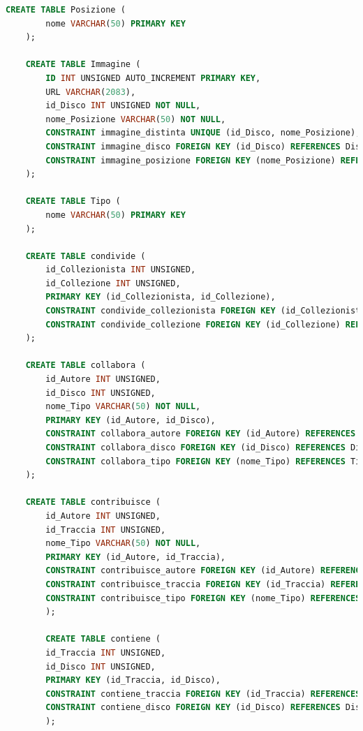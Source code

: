 \documentclass{article}
\begin{document}
\begin{lstlisting}[language=SQL]
    CREATE TABLE Posizione (
        nome VARCHAR(50) PRIMARY KEY
    );

    CREATE TABLE Immagine (
        ID INT UNSIGNED AUTO_INCREMENT PRIMARY KEY,
        URL VARCHAR(2083),
        id_Disco INT UNSIGNED NOT NULL,
        nome_Posizione VARCHAR(50) NOT NULL,
        CONSTRAINT immagine_distinta UNIQUE (id_Disco, nome_Posizione),
        CONSTRAINT immagine_disco FOREIGN KEY (id_Disco) REFERENCES Disco(ID) ON DELETE CASCADE ON UPDATE CASCADE,
        CONSTRAINT immagine_posizione FOREIGN KEY (nome_Posizione) REFERENCES Posizione(nome) ON DELETE NO ACTION ON UPDATE CASCADE
    );

    CREATE TABLE Tipo (
        nome VARCHAR(50) PRIMARY KEY
    );

    CREATE TABLE condivide (
        id_Collezionista INT UNSIGNED,
        id_Collezione INT UNSIGNED,
        PRIMARY KEY (id_Collezionista, id_Collezione),
        CONSTRAINT condivide_collezionista FOREIGN KEY (id_Collezionista) REFERENCES Collezionista(ID) ON DELETE CASCADE ON UPDATE CASCADE,
        CONSTRAINT condivide_collezione FOREIGN KEY (id_Collezione) REFERENCES Collezione(ID) ON DELETE CASCADE ON UPDATE CASCADE
    );

    CREATE TABLE collabora (
        id_Autore INT UNSIGNED,
        id_Disco INT UNSIGNED,
        nome_Tipo VARCHAR(50) NOT NULL,
        PRIMARY KEY (id_Autore, id_Disco),
        CONSTRAINT collabora_autore FOREIGN KEY (id_Autore) REFERENCES Autore(ID) ON DELETE NO ACTION ON UPDATE CASCADE,
        CONSTRAINT collabora_disco FOREIGN KEY (id_Disco) REFERENCES Disco(ID) ON DELETE CASCADE ON UPDATE CASCADE,
        CONSTRAINT collabora_tipo FOREIGN KEY (nome_Tipo) REFERENCES Tipo(nome) ON DELETE NO ACTION ON UPDATE CASCADE
    );
        
    CREATE TABLE contribuisce (
        id_Autore INT UNSIGNED,
        id_Traccia INT UNSIGNED,
        nome_Tipo VARCHAR(50) NOT NULL,
        PRIMARY KEY (id_Autore, id_Traccia),
        CONSTRAINT contribuisce_autore FOREIGN KEY (id_Autore) REFERENCES Autore(ID) ON DELETE CASCADE ON UPDATE CASCADE,
        CONSTRAINT contribuisce_traccia FOREIGN KEY (id_Traccia) REFERENCES Traccia(ID) ON DELETE CASCADE ON UPDATE CASCADE,
        CONSTRAINT contribuisce_tipo FOREIGN KEY (nome_Tipo) REFERENCES Tipo(nome) ON DELETE NO ACTION ON UPDATE CASCADE
        );
        
        CREATE TABLE contiene (
        id_Traccia INT UNSIGNED,
        id_Disco INT UNSIGNED,
        PRIMARY KEY (id_Traccia, id_Disco),
        CONSTRAINT contiene_traccia FOREIGN KEY (id_Traccia) REFERENCES Traccia(ID) ON DELETE CASCADE ON UPDATE CASCADE,
        CONSTRAINT contiene_disco FOREIGN KEY (id_Disco) REFERENCES Disco(ID) ON DELETE CASCADE ON UPDATE CASCADE
        );
        
    \end{lstlisting}
    \pagebreak
\end{document}
